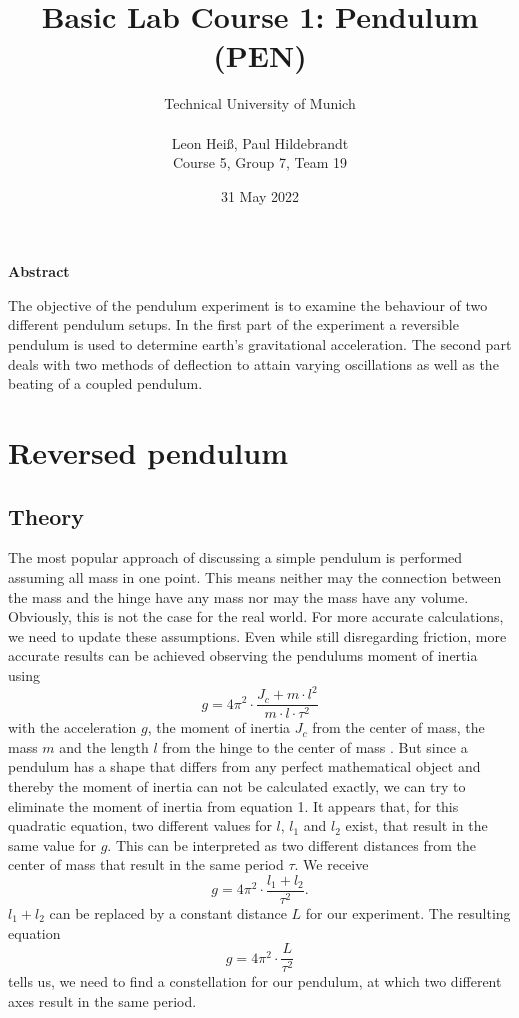 \documentclass{article}
\title{Basic Lab Course 1: Pendulum (PEN)}
\author{Technical University of Munich\\\\Leon Heiß, Paul Hildebrandt \\
Course 5, Group 7, Team 19}
\date{31 May 2022}
\begin{document}
\maketitle
\large
\begin{center}
\textbf{Abstract}\\
\normalsize
\medskip

The objective of the pendulum experiment is to examine the behaviour of two different pendulum setups.
In the first part of the experiment a reversible pendulum is used to determine earth's gravitational acceleration. The second part deals with two methods of deflection to attain varying oscillations as well as the beating of a coupled pendulum.

\end{center}
\normalsize

\tableofcontents

\section{Reversed pendulum}
\subsection{Theory}
The most popular approach of discussing a simple pendulum is performed assuming all mass in one point.
This means neither may the connection between the mass and the hinge have any mass nor may the mass have any volume.
Obviously, this is not the case for the real world. For more accurate calculations, we need to update these assumptions.
Even while still disregarding friction, more accurate results can be achieved observing the pendulums moment of inertia using
\begin{equation}
g = 4\pi^2 \cdot \frac{J_c+m\cdot l^2}{m\cdot l \cdot \tau^2}
\end{equation} 
with the acceleration $g$, the moment of inertia $J_c$ from the center of mass, the mass $m$ and the length $l$ from the hinge to the center of mass \cite{1}.
But since a pendulum has a shape that differs from any perfect mathematical object and thereby the moment of inertia can not be calculated exactly, we can try to eliminate the moment of inertia from equation 1.
It appears that, for this quadratic equation, two different values for $l$, $l_1$ and $l_2$ exist, that result in the same value for $g$.
This can be interpreted as two different distances from the center of mass that result in the same period $\tau$.
We receive
\begin{equation}
g = 4 \pi^2 \cdot \frac{l_1 + l_2}{\tau^2}.
\end{equation}
$l_1 + l_2$ can be replaced by a constant distance $L$ for our experiment.
The resulting equation 
\begin{equation}
g = 4 \pi^2 \cdot \frac{L}{\tau^2}
\end{equation}
tells us, we need to find a constellation for our pendulum, at which two different axes result in the same period.
\end{document}
